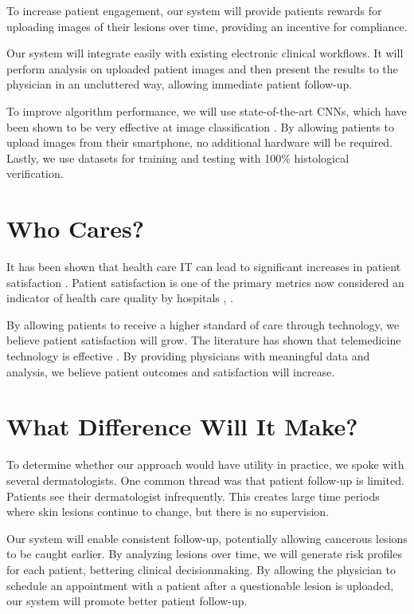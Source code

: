 \documentclass[a4paper,12pt]{article}
\begin{document}
To increase patient engagement, our system will provide patients rewards for
uploading images of their lesions over time, providing an incentive for
compliance.

Our system will integrate easily with existing electronic clinical workflows.
It will perform analysis on uploaded patient images and then present the results
to the physician in an uncluttered way, allowing immediate patient follow-up.

To improve algorithm performance, we will use state-of-the-art CNNs, which have
been shown to be very effective at image classification
\cite{krizhevsky2012imagenet}. By allowing patients to upload images from
their smartphone, no additional hardware will be required. Lastly, we use
datasets for training and testing with 100\% histological verification.

\section{Who Cares?}
It has been shown that health care IT can lead to significant increases in
patient satisfaction \cite{roham2012predicting}. Patient satisfaction is one of
the primary metrics now considered an indicator of health care quality by
hospitals \cite{fenton2012cost}, \cite{bjertnaes2012overall}.

By allowing patients to receive a higher standard of care through technology, we
believe patient satisfaction will grow. The literature has shown that
telemedicine technology is effective \cite{hilty2013effectiveness}. By providing
physicians with meaningful data and analysis, we believe patient outcomes and
satisfaction will increase.

\section{What Difference Will It Make?}
To determine whether our approach would have utility in practice, we spoke with
several dermatologists. One common thread was that patient follow-up is limited.
Patients see their dermatologist infrequently. This creates large time periods
where skin lesions continue to change, but there is no supervision.

Our system will enable consistent follow-up, potentially allowing cancerous
lesions to be caught earlier. By analyzing lesions over time, we will generate
risk profiles for each patient, bettering clinical decisionmaking. By allowing
the physician to schedule an appointment with a patient after a questionable
lesion is uploaded, our system will promote better patient follow-up.
\end{document}
